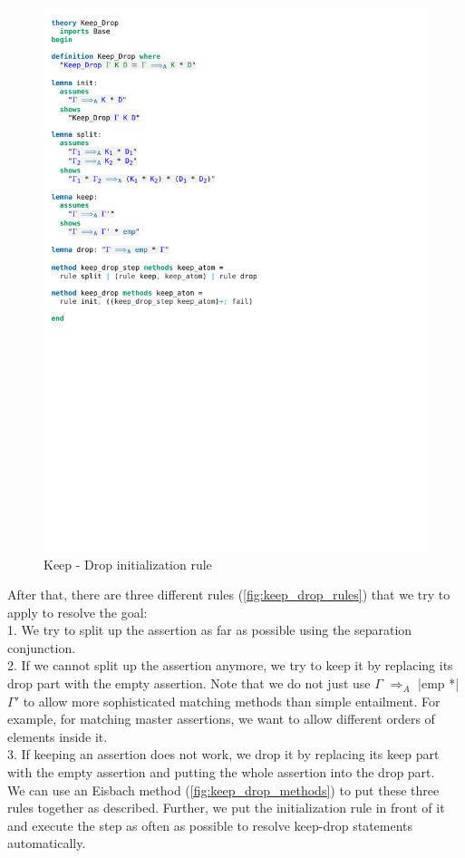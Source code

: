 \begin{figure}[htpb]
    \includegraphics[trim={0 23,4cm 0 3,8cm}, clip, width=1.00\textwidth]{figures/Theory_Keep_Drop.pdf}
    \caption[Keep-Drop initialization rule]{Keep - Drop initialization rule}
    \label{fig:keep_drop_init}
\end{figure}

\noindent After that, there are three different rules (\autoref{fig:keep_drop_rules}) that we try to apply to resolve the goal:\\
1. We try to split up the assertion as far as possible using the separation conjunction.\\
2. If we cannot split up the assertion anymore, we try to keep it by replacing its drop part with the empty assertion. Note that we do not just use $\Gamma$ $\Longrightarrow_A$ |emp *| $\Gamma'$ to allow more sophisticated matching methods than simple entailment. For example, for matching master assertions, we want to allow different orders of elements inside it.\\
3. If keeping an assertion does not work, we drop it by replacing its keep part with the empty assertion and putting the whole assertion into the drop part.\\
We can use an Eisbach method (\autoref{fig:keep_drop_methods}) to put these three rules together as described. Further, we put the initialization rule in front of it and execute the step as often as possible to resolve keep-drop statements automatically.

